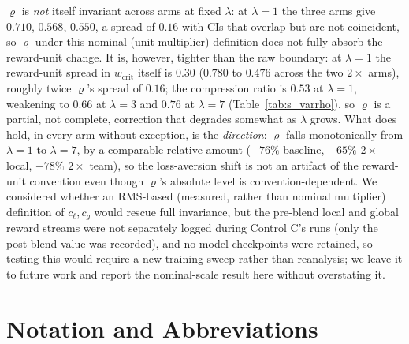 \documentclass[letterpaper]{article} %
\theoremstyle{plain}
\newcommand{\wcrit}{w_{\mathrm{crit}}}
\begin{document}
$\varrho$ is \emph{not} itself invariant across arms at fixed $\lambda$: at $\lambda{=}1$ the three arms
give $0.710$, $0.568$, $0.550$, a spread of $0.16$ with CIs that overlap but are not coincident, so
$\varrho$ under this nominal (unit-multiplier) definition does not fully absorb the reward-unit change.
It is, however, tighter than the raw boundary: at $\lambda{=}1$ the reward-unit spread in $\wcrit$
itself is $0.30$ ($0.780$ to $0.476$ across the two $2\times$ arms), roughly twice $\varrho$'s spread of
$0.16$; the compression ratio is $0.53$ at $\lambda{=}1$, weakening to $0.66$ at $\lambda{=}3$ and
$0.76$ at $\lambda{=}7$ (Table~\ref{tab:s_varrho}), so $\varrho$ is a partial, not complete, correction
that degrades somewhat as $\lambda$ grows. What does hold, in every arm without exception, is the
\emph{direction}: $\varrho$ falls monotonically from $\lambda{=}1$ to $\lambda{=}7$, by a comparable
relative amount ($-76\%$ baseline, $-65\%$ $2\times$ local, $-78\%$ $2\times$ team), so the
loss-aversion shift is not an artifact of the reward-unit convention even though $\varrho$'s absolute
level is convention-dependent. We considered
whether an RMS-based (measured, rather than nominal multiplier) definition of $c_\ell,c_g$ would rescue
full invariance, but the pre-blend local and global reward streams were not separately logged during
Control C's runs (only the post-blend value was recorded), and no model checkpoints were retained, so
testing this would require a new training sweep rather than reanalysis; we leave it to future work and
report the nominal-scale result here without overstating it.

\section{Notation and Abbreviations}
\label{sec:s_notation}
\end{document}
